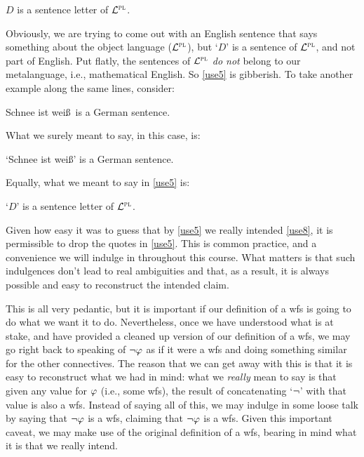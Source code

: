 	\begin{earg}
    \item[\ex{use5}] $D$ is a sentence letter of $\mathcal{L}^{\textsc{pl}}$.
	\end{earg}

Obviously, we are trying to come out with an English sentence that says something about the object language ($\mathcal{L}^{\textsc{pl}}$), but `$D$' is a sentence of $\mathcal{L}^{\textsc{pl}}$, and not part of English.
Put flatly, the sentences of $\mathcal{L}^{\textsc{pl}}$ \textit{do not} belong to our metalanguage, i.e., mathematical English.
So \ref{use5} is gibberish.
To take another example along the same lines, consider:

	\begin{earg}
    \item[\ex{use6}] Schnee ist wei\ss\ is a German sentence.
	\end{earg}

What we surely meant to say, in this case, is:

	\begin{earg}
    \item[\ex{use7}] `Schnee ist wei\ss' is a German sentence.
	\end{earg}

Equally, what we meant to say in \ref{use5} is:

	\begin{earg}
    \item[\ex{use8}] `$D$' is a sentence letter of $\mathcal{L}^{\textsc{pl}}$.
	\end{earg}

Given how easy it was to guess that by \ref{use5} we really intended \ref{use8}, it is permissible to drop the quotes in \ref{use5}.
This is common practice, and a convenience we will indulge in throughout this course.
What matters is that such indulgences don't lead to real ambiguities and that, as a result, it is always possible and easy to reconstruct the intended claim.


This is all very pedantic, but it is important if our definition of a wfs is going to do what we want it to do.
Nevertheless, once we have understood what is at stake, and have provided a cleaned up version of our definition of a wfs, we may go right back to speaking of $\neg \varphi{}$ as if it were a wfs and doing something similar for the other connectives. 
The reason that we can get away with this is that it is easy to reconstruct what we had in mind: what we \textit{really} mean to say is that given any value for $\varphi{}$ (i.e., some wfs), the result of concatenating `$\neg$' with that value is also a wfs.
Instead of saying all of this, we may indulge in some loose talk by saying that $\neg \varphi{}$ is a wfs, claiming that $\neg \varphi{}$ is a wfs. 
Given this important caveat, we may make use of the original definition of a wfs, bearing in mind what it is that we really intend.



